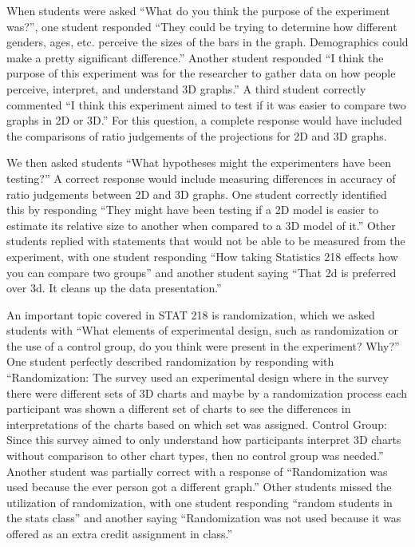 \documentclass[
  12pt,
]{article}
\begin{document}
When students were asked ``What do you think the purpose of the
experiment was?'', one student responded ``They could be trying to
determine how different genders, ages, etc. perceive the sizes of the
bars in the graph. Demographics could make a pretty significant
difference.'' Another student responded ``I think the purpose of this
experiment was for the researcher to gather data on how people perceive,
interpret, and understand 3D graphs.'' A third student correctly
commented ``I think this experiment aimed to test if it was easier to
compare two graphs in 2D or 3D.'' For this question, a complete response
would have included the comparisons of ratio judgements of the
projections for 2D and 3D graphs.

We then asked students ``What hypotheses might the experimenters have
been testing?'' A correct response would include measuring differences
in accuracy of ratio judgements between 2D and 3D graphs. One student
correctly identified this by responding ``They might have been testing
if a 2D model is easier to estimate its relative size to another when
compared to a 3D model of it.'' Other students replied with statements
that would not be able to be measured from the experiment, with one
student responding ``How taking Statistics 218 effects how you can
compare two groups'' and another student saying ``That 2d is preferred
over 3d. It cleans up the data presentation.''

An important topic covered in STAT 218 is randomization, which we asked
students with ``What elements of experimental design, such as
randomization or the use of a control group, do you think were present
in the experiment? Why?'' One student perfectly described randomization
by responding with ``Randomization: The survey used an experimental
design where in the survey there were different sets of 3D charts and
maybe by a randomization process each participant was shown a different
set of charts to see the differences in interpretations of the charts
based on which set was assigned. Control Group: Since this survey aimed
to only understand how participants interpret 3D charts without
comparison to other chart types, then no control group was needed.''
Another student was partially correct with a response of ``Randomization
was used because the ever person got a different graph.'' Other students
missed the utilization of randomization, with one student responding
``random students in the stats class'' and another saying
``Randomization was not used because it was offered as an extra credit
assignment in class.''
\end{document}

